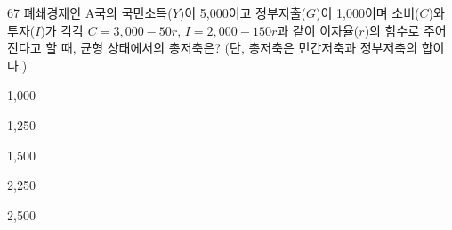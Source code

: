 \begin{question}{67}
폐쇄경제인 A국의 국민소득($Y$)이 5,000이고 정부지출($G$)이 1,000이며 소비($C$)와 투자($I$)가 각각 $C = 3{,}000 - 50r$, $I = 2{,}000 - 150r$과 같이 이자율($r$)의 함수로 주어진다고 할 때, 균형 상태에서의 총저축은? (단, 총저축은 민간저축과 정부저축의 합이다.)
\begin{choices}
  \item 1,000
  \item 1,250
  \item 1,500
  \item 2,250
  \item 2,500
\end{choices}
\end{question}
